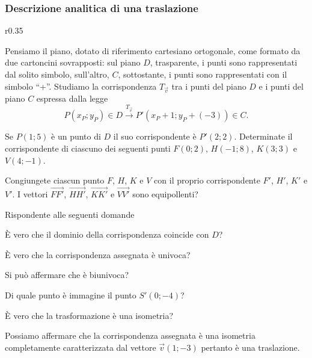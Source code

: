 \subsubsection{Descrizione analitica di una traslazione}

\setlength{\intextsep}{3pt plus 2.0pt minus 2.0pt}
\begin{wrapfigure}{r}{0.35\textwidth}
	
	\centering
\end{wrapfigure}
Pensiamo il piano, dotato di riferimento cartesiano ortogonale, come 
formato da due cartoncini sovrapposti: sul piano \(D\), trasparente, i 
punti sono rappresentati dal solito simbolo, sull'altro, \(C\), 
sottostante, i punti sono rappresentati con il simbolo ``+''.
Studiamo la corrispondenza \(T_{\vec{v}}\) tra i punti del piano \(D\) e 
i punti del piano \(C\) espressa dalla legge
\[P(x_P;y_P)\in D \overset{T_{\vec{v}}}\rightarrow 
P'(x_P+1;y_P+(-3))\in C.\]


Se \(P(1;5)\) è un punto di \(D\) il suo corrispondente è \(P'(2;2)\). 
Determinate il corrispondente di ciascuno dei seguenti punti 
\(F(0;2)\), \(H(-1;8)\), \(K(3;3)\) e \(V(4;-1)\).

Congiungete ciascun punto \(F\), \(H\), \(K\) e \(V\) con il proprio 
corrispondente \(F'\), \(H'\), \(K'\) e \(V'\). I vettori 
\(\overrightarrow{FF'}\), \(\overrightarrow{HH'}\), 
\(\overrightarrow{KK'}\) e \(\overrightarrow{VV'}\) sono equipollenti?

Rispondente alle seguenti domande
\begin{itemize*}
  \item È vero che il dominio della corrispondenza coincide con \(D\)?
  \item È vero che la corrispondenza assegnata è univoca?
  \item Si può affermare che è biunivoca?
  \item Di quale punto è immagine il punto \(S'(0;-4)\)?
  \item È vero che la trasformazione è una isometria?
\end{itemize*}

Possiamo affermare che la corrispondenza assegnata è una isometria 
completamente caratterizzata dal vettore \(\vec{v}(1;-3)\) pertanto è 
una traslazione.

